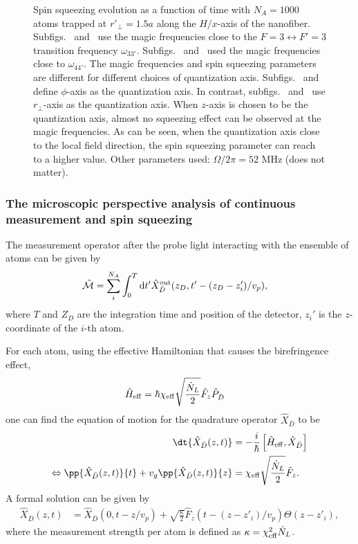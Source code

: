 \documentclass[]{report}
\begin{document}
\begin{figure}
\caption{Spin squeezing evolution as a function of time with $ N_A=1000 $ atoms trapped at $ r'\!_\perp =1.5a $ along the $ H/x $-axis of the nanofiber. Subfigs.~\protect{} and~\protect{} use the magic frequencies close to the $ F=3\leftrightarrow F'=3 $ transition frequency $ \omega_{33'} $. Subfigs.~\protect{} and~\protect{} used the magic frequencies close to $ \omega_{44'} $. The magic frequencies and spin squeezing parameters are different for different choices of quantization axis. Subfigs.~\protect{} and~\protect{} define $ \phi $-axis as the quantization axis. In contrast, subfigs.~\protect{} and~\protect{} use $ r\!_\perp $-axis as the quantization axis. When $ z $-axis is chosen to be the quantization axis, almost no squeezing effect can be observed at the magic frequencies. As can be seen, when the quantization axis close to the local field direction, the spin squeezing parameter can reach to a higher value. Other parameters used: $ \Omega/2\pi=52 $ MHz (does not matter). }\label{fig:xi_magic}
\end{figure}



\newpage

\subsubsection{The microscopic perspective analysis of continuous measurement and spin squeezing}

The measurement operator after the probe light interacting with the ensemble of atoms can be given by
\begin{align}
\hat{\mathcal{M}} &= \sum_i^{N_A} \int_0^T \mathrm{d}t' \hat{X}_{\bar{D}}^{\rm out} (z_D,t'-(z_{D}-z_i')/v_p),\label{eq:Mxout}
\end{align}
where $ T $ and $ Z_D $ are the integration time and position of the detector, $ z_i' $ is the $ z $-coordinate of the $ i $-th atom. 
 

For each atom, using the effective Hamiltonian that causes the birefringence effect, 
\begin{align}
\hat{H}_{\rm eff} &= \hbar \chi_{\rm eff} \sqrt{\frac{\dot{N}_L}{2}} \hat{F}_z \hat{P}_{\bar{D}}
\end{align}
one can find the equation of motion for the quadrature operator $ \hat{X}_{\bar{D}} $ to be
\begin{align}
\dt{\hat{X}_{\bar{D}}(z,t)} &= -\frac{i}{\hbar} \left[ \hat{H}_{\rm eff},\hat{X}_{\bar{D}} \right] \\
\Leftrightarrow \pp{\hat{X}_{\bar{D}}(z,t)}{t}+v_g\pp{\hat{X}_{\bar{D}}(z,t)}{z} &=  \chi_{\rm eff} \sqrt{\frac{\dot{N}_L}{2}} \hat{F}_z.
\end{align}
A formal solution can be given by
\begin{align}
\hat{X}_{\bar{D}} (z,t) &= \hat{X}_{\bar{D}}(0,t-z/v_p) + \sqrt{\frac{\kappa}{2}}\hat{F}_z(t-(z-z'_i)/v_p)\Theta(z-z'_i),
\end{align} 
where the measurement strength per atom is defined as $ \kappa = \chi_{\rm eff}^2 \dot{N}_L $. 
\end{document}
